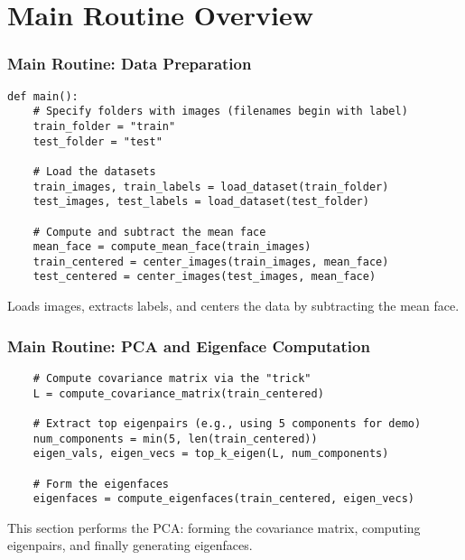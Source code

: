 \documentclass{beamer}
\begin{document}
\section{Main Routine Overview}

\begin{frame}[fragile]
  \frametitle{Main Routine: Data Preparation}
  \begin{lstlisting}
def main():
    # Specify folders with images (filenames begin with label)
    train_folder = "train"
    test_folder = "test"
    
    # Load the datasets
    train_images, train_labels = load_dataset(train_folder)
    test_images, test_labels = load_dataset(test_folder)
    
    # Compute and subtract the mean face
    mean_face = compute_mean_face(train_images)
    train_centered = center_images(train_images, mean_face)
    test_centered = center_images(test_images, mean_face)
  \end{lstlisting}
  Loads images, extracts labels, and centers the data by subtracting the mean face.
\end{frame}

\begin{frame}[fragile]
  \frametitle{Main Routine: PCA and Eigenface Computation}
  \begin{lstlisting}
    # Compute covariance matrix via the "trick"
    L = compute_covariance_matrix(train_centered)
    
    # Extract top eigenpairs (e.g., using 5 components for demo)
    num_components = min(5, len(train_centered))
    eigen_vals, eigen_vecs = top_k_eigen(L, num_components)
    
    # Form the eigenfaces
    eigenfaces = compute_eigenfaces(train_centered, eigen_vecs)
  \end{lstlisting}
  This section performs the PCA: forming the covariance matrix, computing eigenpairs, and finally generating eigenfaces.
\end{frame}
\end{document}
